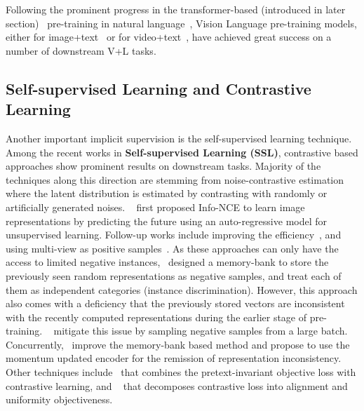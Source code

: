 Following the prominent progress in the transformer-based (introduced in later section)~\citep{vaswani2017attention} pre-training in natural language~\citep{devlin2018bert,radford2018improving,lagler2013gpt2,brown2020language,clark2020electra,raffel2019exploring}, Vision Language pre-training models, either for image+text~\citep{lu2019vilbert,tan2019lxmert,chen2019uniter,li2020oscar,hu2020vivo,zhang2021vinvl,li2020closer,gan2020large,li2020hero,lu202012} or for video+text~\citep{sun2019videobert,li2020hero,miech2020end,zhu2020actbert,lei2021less}, have achieved great success on a number of downstream V+L tasks. 

\subsection{Self-supervised Learning and Contrastive Learning}
Another important implicit supervision is the self-supervised learning technique. 
Among the recent works in \textbf{Self-supervised Learning (SSL)}, contrastive based approaches show prominent results on downstream tasks. Majority of the techniques along this direction are stemming from noise-contrastive estimation~\citep{gutmann2010noise} where the latent distribution is estimated by contrasting with randomly or artificially generated noises. 
~\citep{oord2018representation} first proposed Info-NCE to learn image representations by predicting the future using an auto-regressive model for unsupervised learning. Follow-up works include improving the efficiency~\citep{henaff2019data}, and using multi-view as positive samples~\citep{tian2019contrastive1}. As these approaches can only have the access to limited negative instances,~\citep{wu2018unsupervised} designed a memory-bank to store the previously seen random representations as negative samples, and treat each of them as independent categories (instance discrimination). However, this approach also comes with a deficiency that the previously stored vectors are inconsistent with the recently computed representations during the earlier stage of pre-training. ~\citep{chen2020simple} mitigate this issue by sampling negative samples from a large batch. Concurrently,~\citep{he2020momentum} improve the memory-bank based method and propose to use the momentum updated encoder for the remission of representation inconsistency. Other techniques include~\citep{misra2020self} that combines the pretext-invariant objective loss with contrastive learning, and ~\citep{wang2020understanding} that decomposes contrastive loss into alignment and uniformity objectiveness.


